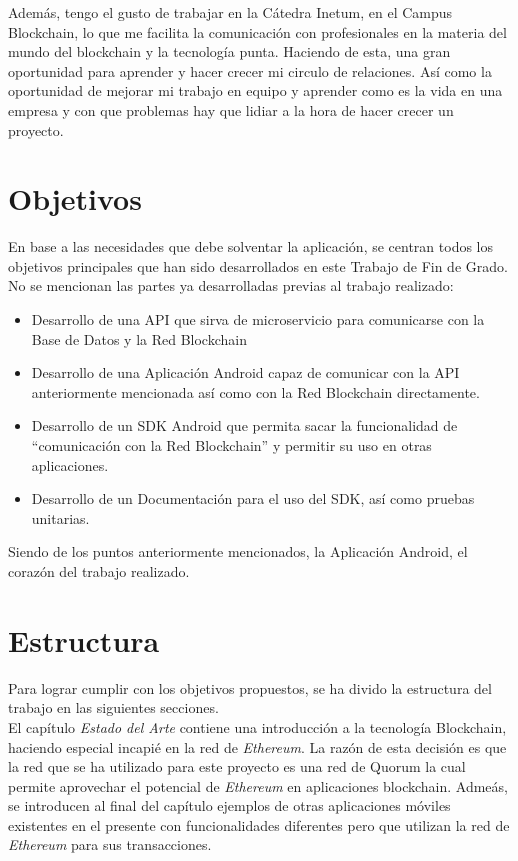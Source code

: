Además, tengo el gusto de trabajar en la Cátedra Inetum, en el Campus Blockchain, lo que me facilita la comunicación con profesionales en la materia del mundo del blockchain y la tecnología punta. Haciendo de esta, una gran oportunidad para aprender y hacer crecer mi circulo de relaciones. Así como la oportunidad de mejorar mi trabajo en equipo y aprender como es la vida en una empresa y con que problemas hay que lidiar a la hora de hacer crecer un proyecto.

\section{Objetivos}

En base a las necesidades que debe solventar la aplicación, se centran todos los objetivos principales que han sido desarrollados en este Trabajo de Fin de Grado. No se mencionan las partes ya desarrolladas previas al trabajo realizado:
\begin{itemize}
\item Desarrollo de una API que sirva de microservicio para comunicarse con la Base de Datos y la Red Blockchain
\item Desarrollo de una Aplicación Android capaz de comunicar con la API anteriormente mencionada así como con la Red Blockchain directamente.
\item Desarrollo de un SDK Android que permita sacar la funcionalidad de ``comunicación con la Red Blockchain'' y permitir su uso en otras aplicaciones.
\item Desarrollo de un Documentación para el uso del SDK, así como pruebas unitarias.
\end{itemize}
Siendo de los puntos anteriormente mencionados, la Aplicación Android, el corazón del trabajo realizado.

\section{Estructura}
Para lograr cumplir con los objetivos propuestos, se ha divido la estructura del trabajo en las siguientes secciones. \\

El capítulo \emph{Estado del Arte} contiene una introducción a la tecnología Blockchain, haciendo especial incapié en la red de \emph{Ethereum}\cite{webEthereum}. La razón de esta decisión es que la red que se ha utilizado para este proyecto es una red de Quorum\cite{webQuorum} la cual permite aprovechar el potencial de \emph{Ethereum} en aplicaciones blockchain. Admeás, se introducen al final del capítulo ejemplos de otras aplicaciones móviles existentes en el presente con funcionalidades diferentes pero que utilizan la red de \emph{Ethereum} para sus transacciones. \\

